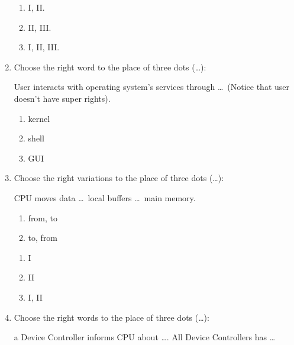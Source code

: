 \documentclass[paper=8.2in:11.6in]{scrartcl}
\begin{document}
\begin{enumerate}
\begin{enumerate}[label=\Roman*.]
\end{enumerate}

\begin{enumerate}[label=\alph*)]

\item I, II.
\item II, III.
\item I, II, III.

\end{enumerate}

\item Choose the right word to the place of three dots (\ldots):

User interacts with operating system’s services through \ldots \ (Notice that user doesn’t have super rights).

\begin{enumerate}[label=\alph*)]

\item kernel
\item shell
\item GUI

\end{enumerate}

\item Choose the right variations to the place of three dots (\ldots):

CPU moves data \ldots \ local buffers \ldots \ main memory.

\begin{enumerate}[label=\Roman*.]

\item from, to
\item to, from

\end{enumerate}

\begin{enumerate}[label=\alph*)]

\item I
\item II
\item I, II

\end{enumerate}

\item Choose the right words to the place of three dots (\ldots):

a Device Controller informs CPU about \ldots . All Device Controllers has \ldots

\begin{enumerate}[label=\alph*)]


\end{enumerate}
\end{enumerate}
\end{document}
